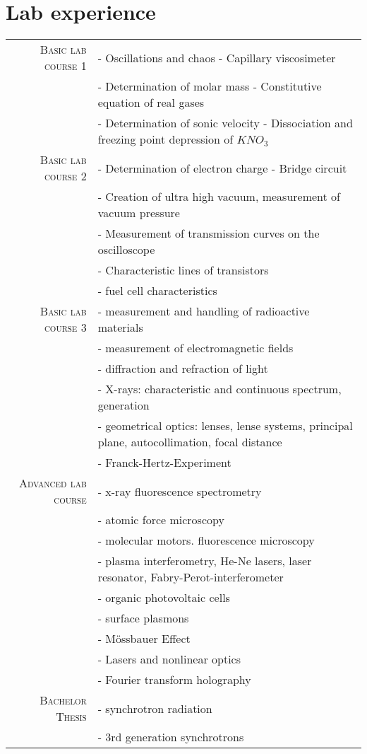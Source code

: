\documentclass[a4paper,10pt]{article}
\begin{document}
\section{Lab experience}
\begin{tabular}{r|p{11cm}}
 \textsc{Basic lab course 1} & - Oscillations and chaos - Capillary viscosimeter\\
			     & - Determination of molar mass - Constitutive equation of real gases\\
			     & - Determination of sonic velocity - Dissociation and freezing point depression of $KNO_3$\\
  \textsc{Basic lab course 2} & - Determination of electron charge - Bridge circuit\\
			     & - Creation of ultra high vacuum, measurement of vacuum pressure\\
			     & - Measurement of transmission curves on the oscilloscope\\
			      &- Characteristic lines of transistors\\
			     & - fuel cell characteristics\\
  \textsc{Basic lab course 3} & - measurement and handling of radioactive materials\\
			     & - measurement of electromagnetic fields\\
			     & - diffraction and refraction of light\\
			     & - X-rays: characteristic and continuous spectrum, generation\\
			     & - geometrical optics: lenses, lense systems, principal plane, autocollimation, focal distance\\
			     & - Franck-Hertz-Experiment\\
  \textsc{Advanced lab course} & - x-ray fluorescence spectrometry\\
			     & - atomic force microscopy\\
			     & - molecular motors. fluorescence microscopy\\
			     & - plasma interferometry, He-Ne lasers, laser resonator, Fabry-Perot-interferometer\\
			     & - organic photovoltaic cells\\
			     & - surface plasmons\\
			     & - Mössbauer Effect\\
			     & - Lasers and nonlinear optics\\
			     & - Fourier transform holography\\
  \textsc{Bachelor Thesis} & - synchrotron radiation\\	
			     & - 3rd generation synchrotrons\\			
\end{tabular}
\end{document}
